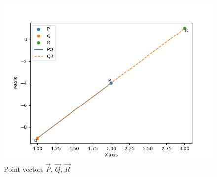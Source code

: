 \begin{enumerate}[label=\thesection.\arabic*,ref=\thesection.\theenumi]
\begin{figure}[H]
    \centering
    \includegraphics[width=\columnwidth]{figs/external-bisector.png}
    \caption{Point vectors $\vec{P}$, $\vec{Q}$, $\vec{R}$}
    \label{fig:enter-label}
\end{figure}


\end{enumerate}
